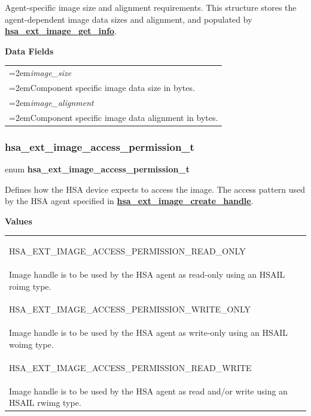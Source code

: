 \documentclass[final]{book}
\newcommand{\reffun}[1]{\textbf{#1}}
\newcommand{\reffld}[1]{\textit{#1}}
\newcommand{\reftyp}[1]{#1}
\newcommand{\refenu}[1]{\reftyp{#1}}
\newenvironment{mylongtable}{\rowcolors{0}{lightgray}{lightgray}\longtable} {
\endlongtable}
\begin{document}
\vspace{-2mm}Agent-specific image size and alignment requirements. This structure stores the agent-dependent image data sizes and alignment, and populated by \hyperlink{group__images_1ga432c568dc14e2bf78b3d2de2ecda3b1d}{\reffun{hsa_\-ext_\-image_\-get_\-info}}.

\noindent\textbf{Data Fields}\\[-6mm]
\begin{longtable}{@{}>{\hangindent=2em}p{\textwidth}}
\reffld{image_\-size}\\\hspace{2em}Component specific image data size in bytes.\\[2mm]
\reffld{image_\-alignment}\\\hspace{2em}Component specific image data alignment in bytes.
\end{longtable}



\subsubsection{hsa_\-ext_\-image_\-access_\-permission_\-t}
\vspace{-5.5mm}\begin{mylongtable}{@{}p{\textwidth}}
\rule{0pt}{3ex}\rule[-2.5ex]{0pt}{0pt}enum \hypertarget{group__images_1gab659478436fb8b92eae3ffe55f09e913}{\textbf{hsa_\-ext_\-image_\-access_\-permission_\-t}}
\end{mylongtable}
\vspace{-2mm}Defines how the HSA device expects to access the image. The access pattern used by the HSA agent specified in \hyperlink{group__images_1ga98fa217ba0209e3e5c2a69feef7647f5}{\reffun{hsa_\-ext_\-image_\-create_\-handle}}.

\noindent\textbf{Values}\\[-5mm]
\begin{longtable}{@{\hspace{2em}}p{\linewidth-2em}}
\hspace{-2em}\hypertarget{group__images_1ggab659478436fb8b92eae3ffe55f09e913a71094ed618e4e51e26a7f8c19e1fcaf3}{\refenu{HSA_\-EXT_\-IMAGE_\-ACCESS_\-PERMISSION_\-READ_\-ONLY}} \\Image handle is to be used by the HSA agent as read-only using an HSAIL roimg type.\\[2mm]
\hspace{-2em}\hypertarget{group__images_1ggab659478436fb8b92eae3ffe55f09e913a92d8fe67219c916c4afd249d9a957642}{\refenu{HSA_\-EXT_\-IMAGE_\-ACCESS_\-PERMISSION_\-WRITE_\-ONLY}} \\Image handle is to be used by the HSA agent as write-only using an HSAIL woimg type.\\[2mm]
\hspace{-2em}\hypertarget{group__images_1ggab659478436fb8b92eae3ffe55f09e913ae4f22cb73c17d46bf667e762f102ccf5}{\refenu{HSA_\-EXT_\-IMAGE_\-ACCESS_\-PERMISSION_\-READ_\-WRITE}} \\Image handle is to be used by the HSA agent as read and/or write using an HSAIL rwimg type.
\end{longtable}
\end{document}
